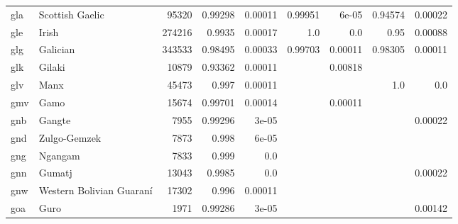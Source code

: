 \documentclass[11pt]{article}
\begin{document}
\begin{table*}[h]
{\begin{tabular}{llrrrrrrr}
gla         & Scottish Gaelic         & 95320         & 0.99298         & 0.00011         & 0.99951         & 6e-05         & 0.94574         & 0.00022         \\

gle         & Irish         & 274216         & 0.9935         & 0.00017         & 1.0         & 0.0         & 0.95         & 0.00088         \\

glg         & Galician         & 343533         & 0.98495         & 0.00033         & 0.99703         & 0.00011         & 0.98305         & 0.00011         \\

glk         & Gilaki         & 10879         & 0.93362         & 0.00011         &          & 0.00818         &          &          \\

glv         & Manx         & 45473         & 0.997         & 0.00011         &          &          & 1.0         & 0.0         \\

gmv         & Gamo         & 15674         & 0.99701         & 0.00014         &          & 0.00011         &          &          \\

gnb         & Gangte         & 7955         & 0.99296         & 3e-05         &          &          &          & 0.00022         \\

gnd         & Zulgo-Gemzek         & 7873         & 0.998         & 6e-05         &          &          &          &          \\

gng         & Ngangam         & 7833         & 0.999         & 0.0         &          &          &          &          \\

gnn         & Gumatj         & 13043         & 0.9985         & 0.0         &          &          &          & 0.00022         \\

gnw         & Western Bolivian Guaraní         & 17302         & 0.996         & 0.00011         &          &          &          &          \\

goa         & Guro         & 1971         & 0.99286         & 3e-05         &          &          &          & 0.00142         \\


\end{tabular}}
\end{table*}
\end{document}
